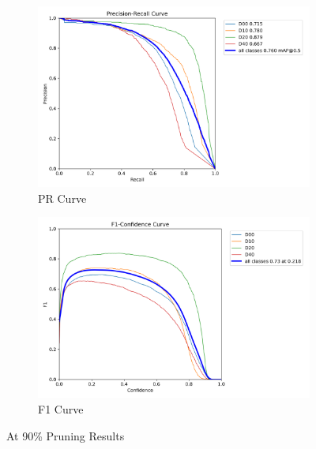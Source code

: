 \begin{figure}[H]
    \centering
    \begin{subfigure}{0.5\linewidth}
        \centering
        \includegraphics[width=\linewidth]{figures/90pruned/PR_curve.png}
        \caption{PR Curve}
    \end{subfigure}
    \hfill
    \begin{subfigure}{0.5\linewidth}
        \centering
        \includegraphics[width=\linewidth]{figures/90pruned/F1_curve.png}
        \caption{F1 Curve}
    \end{subfigure}
    \caption{At 90\% Pruning Results}

\end{figure}


